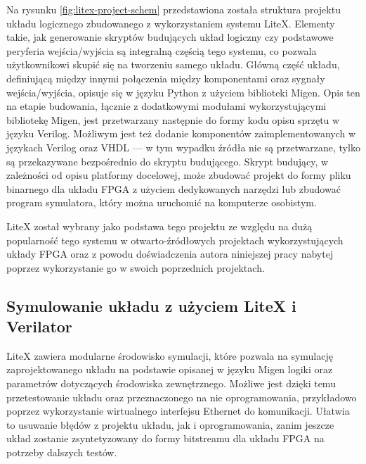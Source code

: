 Na rysunku \ref{fig:litex-project-schem} przedstawiona została struktura projektu układu logicznego zbudowanego z wykorzystaniem systemu LiteX. Elementy takie, jak generowanie skryptów budujących układ logiczny czy podstawowe peryferia wejścia/wyjścia są integralną częścią tego systemu, co pozwala użytkownikowi skupić się na tworzeniu samego układu. Główną część układu, definiującą między innymi połączenia między komponentami oraz sygnały wejścia/wyjścia, opisuje się w języku Python z użyciem biblioteki Migen. Opis ten na etapie budowania, łącznie z dodatkowymi modułami wykorzystującymi bibliotekę Migen, jest przetwarzany następnie do formy kodu opisu sprzętu w języku Verilog. Możliwym jest też dodanie komponentów zaimplementowanych w językach Verilog oraz VHDL --- w tym wypadku źródła nie są przetwarzane, tylko są przekazywane bezpośrednio do skryptu budującego. Skrypt budujący, w zależności od opisu platformy docelowej, może zbudować projekt do formy pliku binarnego dla układu FPGA z użyciem dedykowanych narzędzi lub zbudować program symulatora, który można uruchomić na komputerze osobistym.

LiteX został wybrany jako podstawa tego projektu ze względu na dużą popularność tego systemu w otwarto-źródłowych projektach wykorzystujących układy FPGA oraz z powodu doświadczenia autora niniejszej pracy nabytej poprzez wykorzystanie go w swoich poprzednich projektach.

\subsection{Symulowanie układu z użyciem LiteX i Verilator}

LiteX zawiera modularne środowisko symulacji, które pozwala na symulację zaprojektowanego układu na podstawie opisanej w języku Migen logiki oraz parametrów dotyczących środowiska zewnętrznego. Możliwe jest dzięki temu przetestowanie układu oraz przeznaczonego na nie oprogramowania, przykładowo poprzez wykorzystanie wirtualnego interfejsu Ethernet do komunikacji. Ułatwia to usuwanie błędów z projektu układu, jak i oprogramowania, zanim jeszcze układ zostanie zsyntetyzowany do formy bitstreamu dla układu FPGA na potrzeby dalszych testów.

